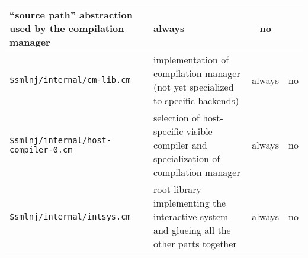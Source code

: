 \documentclass[titlepage,letterpaper]{article}
\begin{document}
\begin{center}
\begin{tabular}{p{2.9in}||p{2.2in}|c|c}
``source path'' abstraction used by the compilation manager & always &
no \\
\hline
{\tt \$smlnj/internal/cm-lib.cm} & implementation of compilation
manager (not yet specialized to specific backends) & always & no \\
\hline
{\tt \$smlnj/internal/host-compiler-0.cm} & selection of host-specific
visible compiler and specialization of compilation manager & always &
no \\
\hline
{\tt \$smlnj/internal/intsys.cm} & root library implementing the
interactive system and glueing all the other parts together & always &
no
\end{tabular}
\end{center}

\pagebreak


\end{document}
